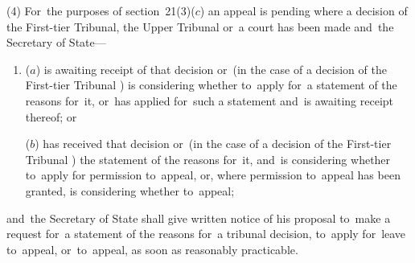 \documentclass[12pt,a4paper]{article}
\begin{document}
%
%

(4) For~the purposes of section~21(3)($c$)  an appeal is pending where a decision of 
the First-tier Tribunal, the Upper Tribunal  %
or~a court has been made and~the Secretary of State—
\begin{enumerate}\item[]
($a$) is awaiting receipt of that decision or~(in the case of 
a decision of the First-tier Tribunal%
) is considering whether to~apply for~a statement of the reasons for~it, or~has applied for~such a statement and~is awaiting receipt thereof; or

($b$) has received that decision or~(in the case of 
a decision of the First-tier Tribunal%
) the statement of the reasons for~it, and~is considering whether to~apply for 
permission  %
to~appeal, or, where 
permission  %
to~appeal has been granted, is considering whether to~appeal;
\end{enumerate}
and~the Secretary of State shall give written notice of his proposal to~make a request for~a statement of the reasons for~a tribunal decision, to~apply for~leave to~appeal, or~to~appeal, as soon as reasonably practicable.
\end{document}
